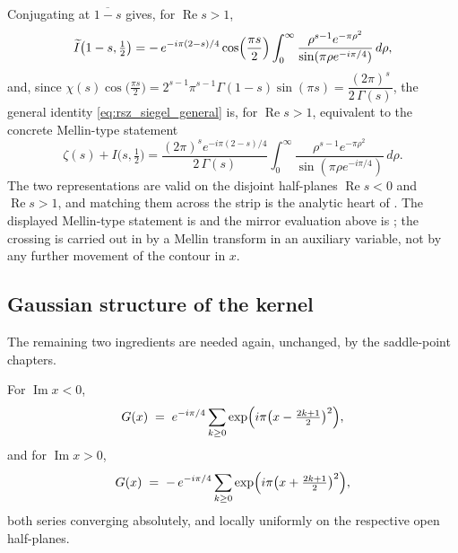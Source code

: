 \begin{remark}
\label{rem:rsz_hankel_mirror}
Conjugating  at $\overline{1-s}$ gives, for $\operatorname{Re}s>1$,
\[
  \widetilde I\bigl(1-s,\tfrac12\bigr)
    =-\,e^{-i\pi(2-s)/4}\cos\Bigl(\frac{\pi s}{2}\Bigr)
      \int_{0}^{\infty}\frac{\rho^{s-1}e^{-\pi\rho^{2}}}{\sin(\pi\rho e^{-i\pi/4})}\,d\rho ,
\]
and, since
$\chi(s)\cos\bigl(\tfrac{\pi s}2\bigr)=2^{s-1}\pi^{s-1}\Gamma(1-s)\sin(\pi s)
=\dfrac{(2\pi)^{s}}{2\,\Gamma(s)}$,
the general identity \eqref{eq:rsz_siegel_general} is, for $\operatorname{Re}s>1$,
equivalent to the concrete Mellin-type statement
\[
  \zeta(s)+I\bigl(s,\tfrac12\bigr)
   =\frac{(2\pi)^{s}e^{-i\pi(2-s)/4}}{2\,\Gamma(s)}
     \int_{0}^{\infty}\frac{\rho^{s-1}e^{-\pi\rho^{2}}}{\sin(\pi\rho e^{-i\pi/4})}\,d\rho .
\]
The two representations are valid on the disjoint half-planes $\operatorname{Re}s<0$ and
$\operatorname{Re}s>1$, and matching them across the strip is the analytic heart of
.  The displayed Mellin-type statement is
 and the mirror evaluation above is ; the crossing
is carried out in  by a Mellin transform in an auxiliary variable, not
by any further movement of the contour in $x$.
\end{remark}

\subsection{Gaussian structure of the kernel}

The remaining two ingredients are needed again, unchanged, by the saddle-point chapters.

\begin{lemma}
\label{lem:rsz_expansion}
\leanok
{}
For $\operatorname{Im}x<0$,
\[
  G(x)\;=\;e^{-i\pi/4}\sum_{k\ge0}\exp\Bigl(i\pi\bigl(x-\tfrac{2k+1}2\bigr)^{2}\Bigr),
\]
and for $\operatorname{Im}x>0$,
\[
  G(x)\;=\;-\,e^{-i\pi/4}\sum_{k\ge0}\exp\Bigl(i\pi\bigl(x+\tfrac{2k+1}2\bigr)^{2}\Bigr),
\]
both series converging absolutely, and locally uniformly on the respective open
half-planes.
\end{lemma}

